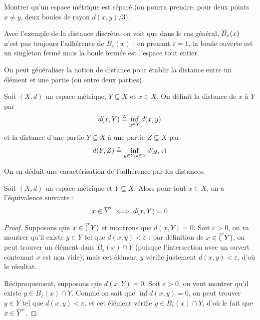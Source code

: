 \begin{exercise}
  Montrer qu'un espace métrique est séparé (on pourra prendre, pour deux points
  $x\neq y$, deux boules de rayon $d(x,y)/3$).
\end{exercise}

\begin{remark}
  Avec l'exemple de la distance discrète, on voit que dans le cas général,
  $\overline{B}_\varepsilon(x)$ n'est pas toujours l'adhérence de $B_\varepsilon(x)$ : en
  prenant $\varepsilon = 1$, la boule ouverte est un singleton fermé mais la
  boule fermée est l'espace tout entier.
\end{remark}

On peut généraliser la notion de distance pour établir la distance entre un
élément et une partie (ou entre deux parties).

\begin{definition}
  Soit $(X,d)$ un espace métrique, $Y\subseteq X$ et $x\in X$. On définit la
  distance de $x$ à $Y$ par
  \[d(x,Y)\triangleq \inf_{y\in Y} d(x,y)\]
  et la distance d'une partie $Y\subseteq X$ à une partie $Z\subseteq X$ par
  \[d(Y,Z)\triangleq \inf_{y\in Y, z \in Z} d(y,z)\]
\end{definition}

On en déduit une caractérisation de l'adhérence par les distances.

\begin{proposition}
  Soit $(X,d)$ un espace métrique et $Y\subseteq X$. Alors pour tout $x\in X$,
  on a l'équivalence suivante :
  \[x\in \overline{Y}^{\mathrm c} \iff d(x,Y) = 0\]
\end{proposition}

\begin{proof}
  Supposons que $x\in \overline{(}^{\mathrm c}Y)$ et montrons que $d(x,Y) = 0$. Soit
  $\varepsilon > 0$, on va montrer qu'il existe $y\in Y$ tel que
  $d(x,y)< \varepsilon$ : par définition de $x\in \overline{(}^{\mathrm c}Y)$, on peut trouver
  un élément dans $B_\varepsilon(x)\cap Y$ (puisque l'intersection avec un
  ouvert contenant $x$ est non vide), mais cet élément $y$ vérifie justement
  $d(x,y) < \varepsilon$, d'où le résultat.

  Réciproquement, supposons que $d(x,Y) = 0$. Soit $\varepsilon > 0$, on veut
  montrer qu'il existe $y\in B_\varepsilon(x)\cap Y$. Comme on sait que
  $\inf d(x,y) = 0$, on peut trouver $y\in Y$ tel que $d(x,y) <\varepsilon$,
  et cet élément vérifie $y\in B_\varepsilon(x)\cap Y$, d'où le fait que
  $x\in \overline{Y}^{\mathrm c}$.
\end{proof}

